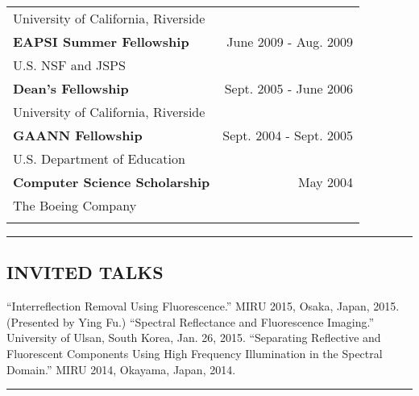 \documentclass[letterpaper,10pt]{article}
\newcommand{\myline}{ \rule{\textwidth}{0.01in} }
\begin{document}
\begin{tabularx}{\textwidth}{b{}r}
        {University of California, Riverside} & {} \\ \vspace{0.05in}
\bfseries{EAPSI Summer Fellowship} & {June 2009 - Aug. 2009} \\
        {U.S. NSF and JSPS} & {} \\ \vspace{0.05in}
\bfseries{Dean's Fellowship} & {Sept. 2005 - June 2006} \\
        {University of California, Riverside} & {} \\ \vspace{0.05in}
\bfseries{GAANN Fellowship} & {Sept. 2004 - Sept. 2005} \\
        {U.S. Department of Education} & {} \\ \vspace{0.05in}
\bfseries{Computer Science Scholarship} & {May 2004} \\
        {The Boeing Company} & {} \\ \vspace{0.05in}
\end{tabularx}

\myline
\subsection*{INVITED TALKS}
``Interreflection Removal Using Fluorescence.''  MIRU 2015, Osaka, Japan,
2015. (Presented by Ying Fu.)\newline
``Spectral Reflectance and Fluorescence Imaging.'' University of Ulsan, South
Korea, Jan. 26, 2015.\newline
``Separating Reflective and Fluorescent Components Using High Frequency Illumination
in the Spectral Domain.'' MIRU 2014, Okayama, Japan, 2014.
\myline
\end{document}
